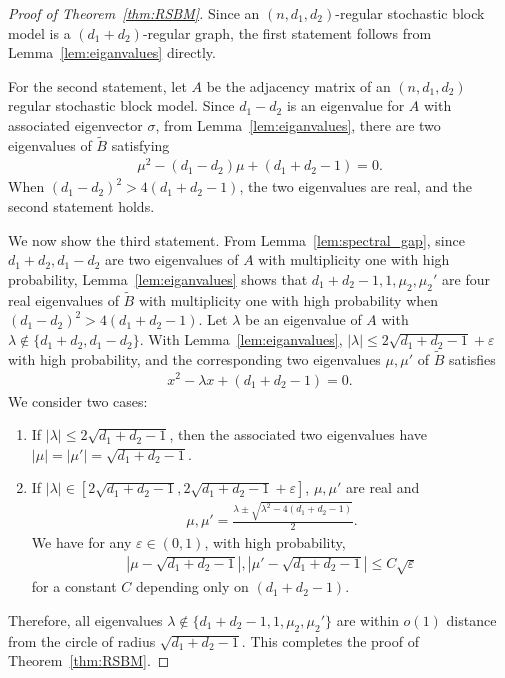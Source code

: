 \documentclass[11pt,reqno]{amsart}
\theoremstyle{definition}
\begin{document}
\begin{proof}[Proof of Theorem~\ref{thm:RSBM}]
    Since an $(n,d_1,d_2)$-regular stochastic block model is a $(d_1+d_2)$-regular graph, the first statement follows from Lemma~\ref{lem:eiganvalues} directly.

    For the second statement, let $A$ be the adjacency matrix of an $(n,d_1,d_2)$ regular stochastic block model. Since $d_1-d_2$ is an eigenvalue for $A$ with associated eigenvector $\sigma$, from Lemma~\ref{lem:eiganvalues}, there are two eigenvalues of $\tilde B$ satisfying 
    \begin{align}
    \mu^2-(d_1-d_2)\mu+(d_1+d_2-1)=0.
    \end{align}
    When $(d_1-d_2)^2>4(d_1+d_2-1)$, the two eigenvalues are real, and the second statement holds.

    We now show the third statement. From Lemma~\ref{lem:spectral_gap}, since $d_1+d_2, d_1-d_2$ are two eigenvalues of $A$ with multiplicity one with high probability,  Lemma~\ref{lem:eiganvalues} shows that $d_1+d_2-1,1, \mu_2,\mu_2'$ are four real eigenvalues of $\tilde B$ with multiplicity one with high probability when $(d_1-d_2)^2>4(d_1+d_2-1)$.
Let $\lambda$ be an eigenvalue of $A$ with $\lambda\not\in \{d_1+d_2,d_1-d_2\}$. With Lemma~\ref{lem:eiganvalues}, $|\lambda|\leq 2\sqrt{d_1+d_2-1}+\varepsilon$ with high probability, and the corresponding two eigenvalues $\mu,\mu'$ of $\tilde B$ satisfies 
 \begin{align}  
    x^2-\lambda x+(d_1+d_2-1)=0.
    \end{align}
  We consider two cases:
    \begin{enumerate}
        \item If $|\lambda| \leq 2\sqrt{d_1+d_2-1}$, then the associated two eigenvalues have $|\mu|=|\mu'|=\sqrt{d_1+d_2-1}$.
        \item If $|\lambda|\in [2\sqrt{d_1+d_2-1},2\sqrt{d_1+d_2-1}+\varepsilon]$, $\mu,\mu'$ are real and 
        \begin{align}
            \mu,\mu'=\frac{\lambda\pm \sqrt{\lambda^2-4(d_1+d_2-1)}}{2}.
        \end{align}
        We have  for any $\varepsilon\in (0,1)$, with high probability,
        \begin{align}
            |\mu-\sqrt{d_1+d_2-1}|, |\mu'-\sqrt{d_1+d_2-1}|\leq C\sqrt{\varepsilon}  
        \end{align} 
        for a constant $C$ depending only on $(d_1+d_2-1)$.
    \end{enumerate}
   Therefore, all  eigenvalues $\lambda\not\in $$\{d_1+d_2-1,1,\mu_2,\mu_2' \}$ are within $o(1)$ distance from the circle of radius $\sqrt{d_1+d_2-1}$. This completes the proof of Theorem~\ref{thm:RSBM}.
\end{proof}
\end{document}
